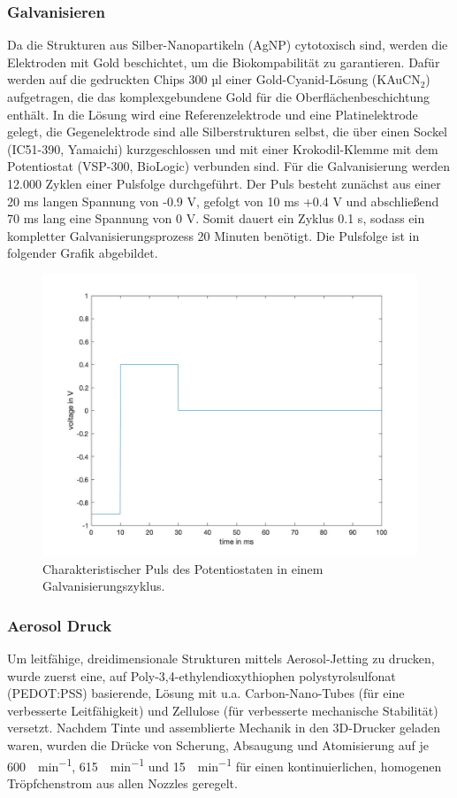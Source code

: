 \subsubsection{Galvanisieren}

Da die Strukturen aus Silber-Nanopartikeln (AgNP) cytotoxisch sind, werden die Elektroden mit Gold beschichtet, um die Biokompabilität zu garantieren. Dafür werden auf die gedruckten Chips 300 µl einer Gold-Cyanid-Lösung (KAuCN$_2$) aufgetragen, die das komplexgebundene Gold für die Oberflächenbeschichtung enthält. In die Lösung wird  eine Referenzelektrode und eine Platinelektrode gelegt, die Gegenelektrode sind alle Silberstrukturen selbst, die über einen Sockel (IC51-390, Yamaichi) kurzgeschlossen und mit einer Krokodil-Klemme mit dem Potentiostat (VSP-300, BioLogic) verbunden sind. Für die Galvanisierung werden 12.000 Zyklen einer Pulsfolge durchgeführt. Der Puls besteht zunächst aus einer 20 ms langen Spannung von -0.9 V, gefolgt von 10 ms +0.4 V und abschließend 70 ms lang eine Spannung von 0 V. Somit dauert ein Zyklus 0.1 s, sodass ein kompletter Galvanisierungsprozess 20 Minuten benötigt. Die Pulsfolge ist in folgender Grafik abgebildet.
\begin{figure}
    \centering
    \includegraphics[width=1.0\textwidth]{img/galvanisierungpulsecurve.jpg}
    \caption{Charakteristischer Puls des Potentiostaten in einem Galvanisierungszyklus.}
    \label{fig:galvanisierung}
\end{figure}



\subsubsection{Aerosol Druck}
Um leitfähige, dreidimensionale Strukturen mittels Aerosol-Jetting zu drucken, wurde zuerst eine, auf Poly-3,4-ethylendioxythiophen polystyrolsulfonat (PEDOT:PSS) basierende, Lösung mit u.a. Carbon-Nano-Tubes (für eine verbesserte Leitfähigkeit) und Zellulose (für verbesserte mechanische Stabilität) versetzt. Nachdem Tinte und assemblierte Mechanik in den 3D-Drucker geladen waren, wurden die Drücke von Scherung, Absaugung und Atomisierung auf je \SI{600}{\ccm \per \minute}, \SI{615}{\ccm \per \minute} und \SI{15}{\ccm \per \minute} für einen kontinuierlichen, homogenen Tröpfchenstrom aus allen Nozzles geregelt.
\clearpage

